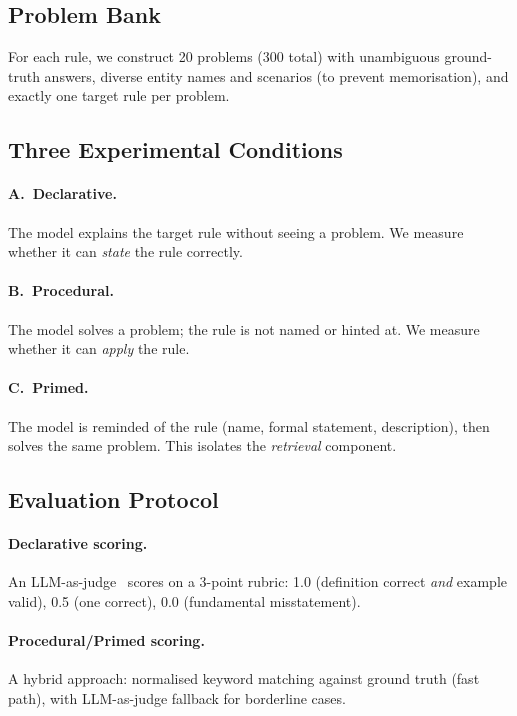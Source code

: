 \documentclass[11pt]{article}
\begin{document}
\subsection{Problem Bank}
For each rule, we construct 20 problems (300 total) with
unambiguous ground-truth answers, diverse entity names and scenarios
(to prevent memorisation), and exactly one target rule per problem.

\subsection{Three Experimental Conditions}

\paragraph{A.\ Declarative.}
The model explains the target rule without seeing a problem.
We measure whether it can \emph{state} the rule correctly.

\paragraph{B.\ Procedural.}
The model solves a problem; the rule is not named or hinted at.
We measure whether it can \emph{apply} the rule.

\paragraph{C.\ Primed.}
The model is reminded of the rule (name, formal statement,
description), then solves the same problem.
This isolates the \emph{retrieval} component.

\subsection{Evaluation Protocol}

\paragraph{Declarative scoring.}
An LLM-as-judge~\cite{zheng2024judging} scores on a 3-point rubric:
1.0 (definition correct \emph{and} example valid),
0.5 (one correct), 0.0 (fundamental misstatement).

\paragraph{Procedural/Primed scoring.}
A hybrid approach: normalised keyword matching against ground truth
(fast path), with LLM-as-judge fallback for borderline cases.
\end{document}
